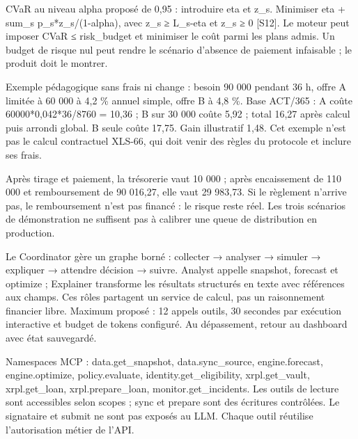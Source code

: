 \documentclass[10pt,a4paper]{article}
\makeatletter
\renewcommand\section{\@startsection{section}{1}{0pt}{16pt plus 2pt minus 1pt}{8pt}{\displayfont\fontsize{16}{20}\selectfont\color{forest}}}
\makeatother
\begin{document}
CVaR au niveau alpha proposé de 0,95 : introduire eta et z\_\allowbreak s. Minimiser eta + sum\_\allowbreak s p\_\allowbreak s*z\_\allowbreak s/(1-alpha), avec z\_\allowbreak s ≥ L\_\allowbreak s-eta et z\_\allowbreak s ≥ 0 [S12]. Le moteur peut imposer CVaR ≤ risk\_\allowbreak budget et minimiser le coût parmi les plans admis. Un budget de risque nul peut rendre le scénario d'absence de paiement infaisable ; le produit doit le montrer.\par

Exemple pédagogique sans frais ni change : besoin 90 000 pendant 36 h, offre A limitée à 60 000 à 4,2 \% annuel simple, offre B à 4,8 \%. Base ACT/365 : A coûte 60000*0,042*36/8760 = 10,36 ; B sur 30 000 coûte 5,92 ; total 16,27 après calcul puis arrondi global. B seule coûte 17,75. Gain illustratif 1,48. Cet exemple n'est pas le calcul contractuel XLS-66, qui doit venir des règles du protocole et inclure ses frais.\par

Après tirage et paiement, la trésorerie vaut 10 000 ; après encaissement de 110 000 et remboursement de 90 016,27, elle vaut 29 983,73. Si le règlement n'arrive pas, le remboursement n'est pas financé : le risque reste réel. Les trois scénarios de démonstration ne suffisent pas à calibrer une queue de distribution en production.\par

\section{Agents IA et outils MCP}\label{ch:15}
Le Coordinator gère un graphe borné : collecter → analyser → simuler → expliquer → attendre décision → suivre. Analyst appelle snapshot, forecast et optimize ; Explainer transforme les résultats structurés en texte avec références aux champs. Ces rôles partagent un service de calcul, pas un raisonnement financier libre. Maximum proposé : 12 appels outils, 30 secondes par exécution interactive et budget de tokens configuré. Au dépassement, retour au dashboard avec état sauvegardé.\par

Namespaces MCP : data.get\_\allowbreak snapshot, data.sync\_\allowbreak source, engine.forecast, engine.optimize, policy.evaluate, identity.get\_\allowbreak eligibility, xrpl.get\_\allowbreak vault, xrpl.get\_\allowbreak loan, xrpl.prepare\_\allowbreak loan, monitor.get\_\allowbreak incidents. Les outils de lecture sont accessibles selon scopes ; sync et prepare sont des écritures contrôlées. Le signataire et submit ne sont pas exposés au LLM. Chaque outil réutilise l'autorisation métier de l'API.\par
\end{document}
